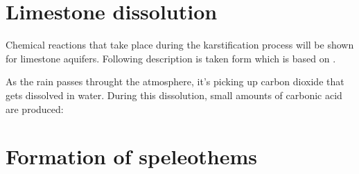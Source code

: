 \section{Limestone dissolution}

Chemical reactions that take place during the karstification process will be
shown for limestone aquifers. Following description is taken form \cite{dreybrodt2002}
which is based on \cite{plummer1978}.

As the rain passes throught the atmosphere, it's picking up carbon dioxide that
gets dissolved in water. During this dissolution, small amounts of carbonic acid
are produced:

 


\section{Formation of speleothems}
